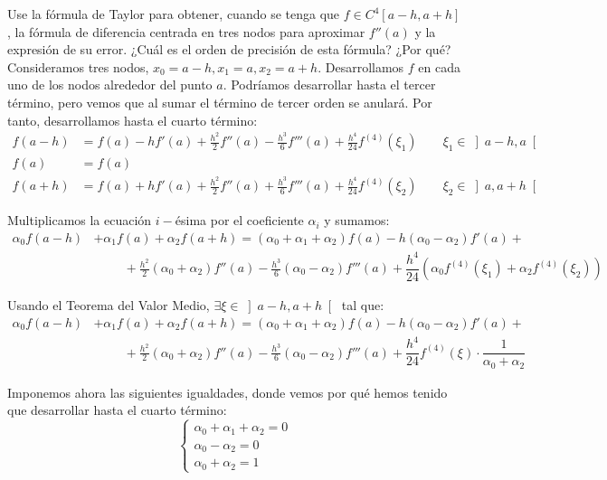 \begin{ejercicio}\label{ej:2.1.6}
    Use la fórmula de Taylor para obtener, cuando se tenga que $f \in C^4[a - h, a + h]$, la fórmula de diferencia centrada en tres nodos para aproximar $f''(a)$ y la expresión de su error. ¿Cuál es el orden de precisión de esta fórmula? ¿Por qué?\\

    Consideramos tres nodos, $x_0=a-h, x_1=a, x_2=a+h$. Desarrollamos $f$ en cada uno de los nodos alrededor del punto $a$. Podríamos desarrollar hasta el tercer término, pero vemos que al sumar el término de tercer orden se anulará. Por tanto, desarrollamos hasta el cuarto término:
    \begin{align*}
        f(a-h) &= f(a) - hf'(a) + \frac{h^2}{2}f''(a) - \frac{h^3}{6}f'''(a) + \frac{h^4}{24}f^{(4)}(\xi_1)\qquad \xi_1\in\left]a-h, a\right[\\
        f(a) &= f(a)\\
        f(a+h) &= f(a) + hf'(a) + \frac{h^2}{2}f''(a) + \frac{h^3}{6}f'''(a) + \frac{h^4}{24}f^{(4)}(\xi_2)\qquad \xi_2\in\left]a, a+h\right[
    \end{align*}

    Multiplicamos la ecuación $i-$ésima por el coeficiente $\alpha_i$ y sumamos:
    \begin{align*}
        \alpha_0f(a-h) &+ \alpha_1f(a) + \alpha_2f(a+h) = \left(\alpha_0+\alpha_1+\alpha_2\right)f(a) -h\left(\alpha_0-\alpha_2\right)f'(a) +\\&\hspace{1cm}+ \frac{h^2}{2}\left(\alpha_0+\alpha_2\right)f''(a) - \frac{h^3}{6}\left(\alpha_0-\alpha_2\right)f'''(a) + \dfrac{h^4}{24}\left(\alpha_0f^{(4)}(\xi_1) + \alpha_2f^{(4)}(\xi_2)\right)
    \end{align*}

    Usando el Teorema del Valor Medio, $\exists \xi\in\left]a-h, a+h\right[$ tal que:
    \begin{align*}
        \alpha_0f(a-h) &+ \alpha_1f(a) + \alpha_2f(a+h) = \left(\alpha_0+\alpha_1+\alpha_2\right)f(a) -h\left(\alpha_0-\alpha_2\right)f'(a) +\\&\hspace{1cm}+ \frac{h^2}{2}\left(\alpha_0+\alpha_2\right)f''(a) - \frac{h^3}{6}\left(\alpha_0-\alpha_2\right)f'''(a) + \dfrac{h^4}{24}f^{(4)}(\xi)\cdot \dfrac{1}{\alpha_0+\alpha_2}
    \end{align*}

    Imponemos ahora las siguientes igualdades, donde vemos por qué hemos tenido que desarrollar hasta el cuarto término:
    \begin{equation*}
        \begin{cases}
            \alpha_0+\alpha_1+\alpha_2 = 0\\
            \alpha_0-\alpha_2 = 0\\
            \alpha_0+\alpha_2 = 1
        \end{cases}
    \end{equation*}


\end{ejercicio}
